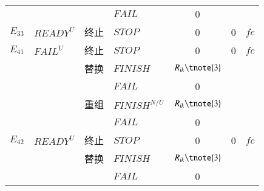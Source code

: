 \begin{table}[htbp]
\begin{threeparttable}
\begin{tabular}{clclccc}
            
            {}
            & {}
            & {} 
            & {$FAIL$} 
            & {0}
            & {} 
            & {} \\
            
            {$E_{33}$} 
            & {${READY^U}$}
            & {终止}
            & {$STOP$} 
            & {0} 
            & {0} 
            & {$fc$} \\
            {$E_{41}$} 
            & {${FAIL^U}$}
            & {终止}
            & {$STOP$} 
            & {0} 
            & {0} 
            & {$fc$} \\
            
            {}
            & {}
            & {替换} 
            & {$FINISH$} 
            & $R_{ik}\tnote{3}$ 
            & {\multirow{2}{*}{$T_{ik}$}} 
            & {\multirow{2}{*}{$C_{ik}$}} \\
            
            {}
            & {}
            & {} 
            & {$FAIL$} 
            & {0}
            & {} 
            & {} \\
            
            {}
            & {}
            & {重组} 
            & {$FINISH^{N/U}$} 
            & $R_{ik}\tnote{3}$ 
            & {\multirow{2}{*}{$T_{i0}+\sum\limits_{x = i}^j {({T_{xk}} - {T_{x0}})} $}}
            & {\multirow{2}{*}{$C_{i0}+\sum\limits_{x = i}^j {({C_{xk}} - {C_{x0}})} $}} \\
            
            
            {}
            & {}
            & {} 
            & {$FAIL$} 
            & {0}
            & {} 
            & {} \\
            {$E_{42}$} 
            & {${READY^U}$}
            & {终止}
            & {$STOP$} 
            & {0} 
            & {0} 
            & {$fc$} \\
            
            {}
            & {}
            & {替换} 
            & {$FINISH$} 
            & $R_{ik}\tnote{3}$ 
            & {\multirow{2}{*}{$T_{ik}-T_{i0}$}} 
            & {\multirow{2}{*}{$C_{ik}-C_{i0}$}} \\
            
            {}
            & {}
            & {} 
            & {$FAIL$} 
            & {0}
            & {} 
            & {} \\
            

\end{tabular}
\end{threeparttable}
\end{table}
